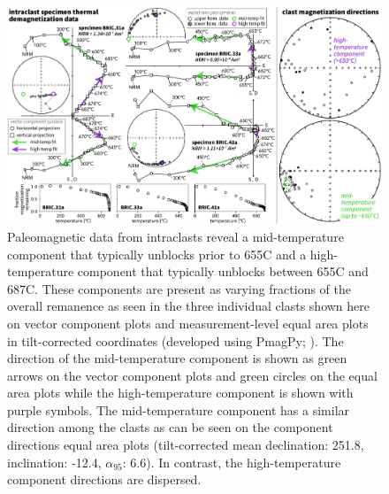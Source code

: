 \documentclass[draft]{agujournal2018}
\begin{document}
\begin{figure}[!ht]
\noindent\includegraphics[width=\textwidth]{figures/BRIC_pmag.pdf}
\caption{\small{Paleomagnetic data from intraclasts reveal a mid-temperature component that typically unblocks prior to 655\textdegree C and a high-temperature component that typically unblocks between 655\textdegree C and 687\textdegree C. These components are present as varying fractions of the overall remanence as seen in the three individual clasts shown here on vector component plots and measurement-level equal area plots in tilt-corrected coordinates (developed using PmagPy; \citealp{Tauxe2016a}). The direction of the mid-temperature component is shown as green arrows on the vector component plots and green circles on the equal area plots while the high-temperature component is shown with purple symbols. The mid-temperature component has a similar direction among the clasts as can be seen on the component directions equal area plots (tilt-corrected mean declination: 251.8, inclination: -12.4, $\alpha_{95}$: 6.6). In contrast, the high-temperature component directions are dispersed.}}
\label{fig:intraclast_pmag}
\end{figure}
\end{document}
